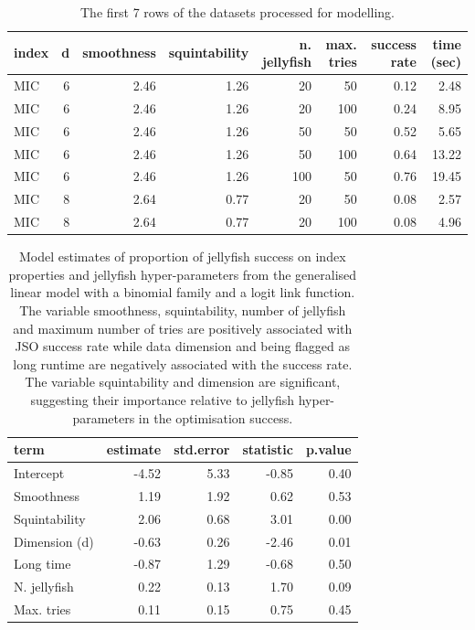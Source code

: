 \documentclass[
  12pt,
]{interact}
\theoremstyle{plain}
\begin{document}
\hypertarget{tbl-mod-data}{}
\begin{table}
\caption{\label{tbl-mod-data}The first 7 rows of the datasets processed for modelling. }\tabularnewline

\centering\begingroup\fontsize{10}{12}\selectfont

\begin{tabular}{lrrrrrrr}
\toprule
index & d & smoothness & squintability & n. jellyfish & max. tries & success rate & time (sec)\\
\midrule
MIC & 6 & 2.46 & 1.26 & 20 & 50 & 0.12 & 2.48\\
MIC & 6 & 2.46 & 1.26 & 20 & 100 & 0.24 & 8.95\\
MIC & 6 & 2.46 & 1.26 & 50 & 50 & 0.52 & 5.65\\
MIC & 6 & 2.46 & 1.26 & 50 & 100 & 0.64 & 13.22\\
MIC & 6 & 2.46 & 1.26 & 100 & 50 & 0.76 & 19.45\\
MIC & 8 & 2.64 & 0.77 & 20 & 50 & 0.08 & 2.57\\
MIC & 8 & 2.64 & 0.77 & 20 & 100 & 0.08 & 4.96\\
\bottomrule
\end{tabular}
\endgroup{}
\end{table}

\hypertarget{tbl-mod-output}{}
\begin{table}
\caption{\label{tbl-mod-output}Model estimates of proportion of jellyfish success on index properties
and jellyfish hyper-parameters from the generalised linear model with a
binomial family and a logit link function. The variable smoothness,
squintability, number of jellyfish and maximum number of tries are
positively associated with JSO success rate while data dimension and
being flagged as long runtime are negatively associated with the success
rate. The variable squintability and dimension are significant,
suggesting their importance relative to jellyfish hyper-parameters in
the optimisation success. }\tabularnewline

\centering\begingroup\fontsize{10}{12}\selectfont

\begin{tabular}{|>{}lrrr>{}r|}
\toprule
term & estimate & std.error & statistic & p.value\\
\midrule
Intercept & -4.52 & 5.33 & -0.85 & 0.40\\
Smoothness & 1.19 & 1.92 & 0.62 & 0.53\\
Squintability & 2.06 & 0.68 & 3.01 & 0.00\\
Dimension (d) & -0.63 & 0.26 & -2.46 & 0.01\\
Long time & -0.87 & 1.29 & -0.68 & 0.50\\
N. jellyfish & 0.22 & 0.13 & 1.70 & 0.09\\
Max. tries & 0.11 & 0.15 & 0.75 & 0.45\\
\bottomrule
\end{tabular}
\endgroup{}
\end{table}
\end{document}
